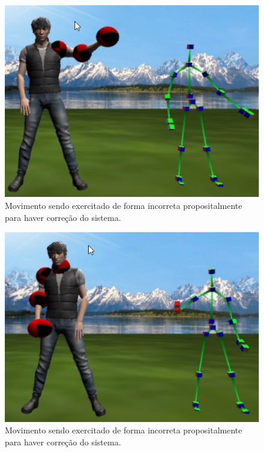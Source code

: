   \begin{figure}[H]
  \centering
  \includegraphics [keepaspectratio=true,scale=0.60]{figuras/bracoDireitaErrada.eps}
  \caption{Movimento sendo exercitado de forma incorreta propositalmente para haver correção do sistema.}
  \label{img:bracoDireitaErrada}
  \end{figure}

  \begin{figure}[H]
  \centering
  \includegraphics [keepaspectratio=true,scale=0.60]{figuras/bracoEsquerdaErrada.eps}
  \caption{Movimento sendo exercitado de forma incorreta propositalmente para haver correção do sistema.}
  \label{img:bracoEsquerdaErrada}
  \end{figure}


